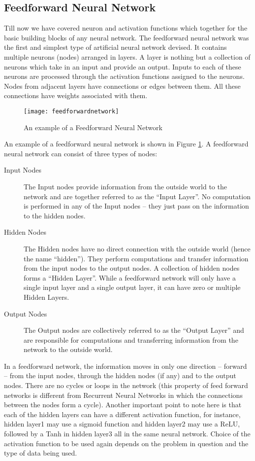 \documentclass{report}
\begin{document}
\subsection{Feedforward Neural Network}
Till now we have covered neuron and activation functions which together for the basic building blocks of any neural network. The feedforward
neural network was the first and simplest type of artificial neural network devised. It contains multiple neurons (nodes) arranged in layers.
A layer is nothing but a collection of neurons which take in an input and provide an output. Inputs to each of these neurons are processed
through the activation functions assigned to the neurons. Nodes from adjacent layers have connections or edges between them. All these connections have weights associated with them.
\begin{figure}[h]
  \centering
  \texttt{[image: feedforwardnetwork]}
  \caption{An example of a Feedforward Neural Network}
  \label{fig:feedforwardnetwork}
\end{figure}
An example of a feedforward neural network is shown in Figure \ref{fig:feedforwardnetwork}. A feedforward neural network can consist of three types of nodes:
\begin{description}
\item[ Input Nodes ] The Input nodes provide information from the outside world to the network and are together referred to as the
  “Input Layer”. No computation is performed in any of the Input nodes – they just pass on the information to the hidden nodes.
\item[  Hidden Nodes ]  The Hidden nodes have no direct connection with the outside world (hence the name “hidden”). They perform
  computations and transfer information from the input nodes to the output nodes. A collection of hidden nodes forms a “Hidden Layer”.
  While a feedforward network will only have a single input layer and a single output layer, it can have zero or multiple Hidden Layers.
\item [ Output Nodes ] The Output nodes are collectively referred to as the “Output Layer” and are responsible for computations and
  transferring information from the network to the outside world.
\end{description}

In a feedforward network, the information moves in only one direction – forward – from the input nodes, through the hidden nodes (if any)
and to the output nodes. There are no cycles or loops in the network (this property of feed forward networks is different from Recurrent
Neural Networks in which the connections between the nodes form a cycle). Another important point to note here is that each of the hidden
layers can have a different activation function, for instance, hidden layer1 may use a sigmoid function and hidden layer2 may use a ReLU,
followed by a Tanh in hidden layer3 all in the same neural network. Choice of the activation function to be used again depends on the
problem in question and the type of data being used.
\end{document}
